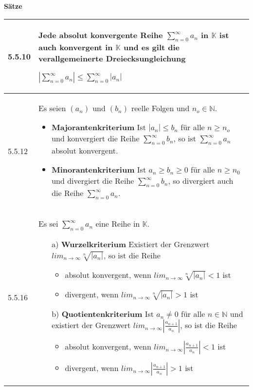     \noindent 
    \textbf{Sätze}
    \begin{table}[H]
    \begin{tabularx}{\textwidth}{X m{16cm}}
        \toprule

        5.5.10& Jede absolut konvergente Reihe $\sum^{\infty}_{n=0} a_n$ in $\mathbb{K}$ ist auch konvergent in $\mathbb{K}$ und es
                gilt die verallgemeinerte Dreiecksungleichung \hfill \break
                \centerline{$|\sum^{\infty}_{n=0}a_n| \leq \sum^{\infty}_{n=0} |a_n|$} \\
        \midrule
        5.5.12& Es seien $(a_n)$ und $(b_n)$ reelle Folgen und $n_o \in \mathbb{N}$.
                \begin{itemize}
                    \item \textbf{Majorantenkriterium} \hfill \break 
                            Ist $|a_n| \leq b_n$ für alle $n \geq n_o$ und konvergiert die Reihe $\sum^{\infty}_{n=0}b_n$, so ist
                            $\sum^{\infty}_{n=0} a_n$ absolut konvergent.
                    \item \textbf{Minorantenkriterium} \hfill \break
                            Ist $a_n \geq b_n \geq 0$ für alle $n \geq n_0$ und divergiert die Reihe $\sum^{\infty}_{n=0}b_n$, so 
                            divergiert auch die Reihe $\sum^{\infty}_{n=0}a_n$. 
                \end{itemize} \\
        \midrule
        5.5.16& Es sei $\sum^{\infty}_{n=0}a_n$ eine Reihe in $\mathbb{K}$.
                \begin{itemize}
                    \item[a)] \textbf{Wurzelkriterium} \hfill \break
                            Existiert der Grenzwert $lim_{n \rightarrow \infty} \sqrt[n]{|a_n|}$, so ist die Reihe
                            \begin{itemize}
                                \item absolut konvergent, wenn $lim_{n \rightarrow \infty} \sqrt[n]{|a_n|} < 1$ ist
                                \item divergent, wenn $lim_{n \rightarrow \infty} \sqrt[n]{|a_n|} > 1$ ist
                            \end{itemize}
                    \item[b)] \textbf{Quotientenkriterium} \hfill \break
                            Ist $a_n \neq 0$ für alle $n \in \mathbb{N}$ und existiert der Grenzwert 
                            $lim_{n \rightarrow \infty} |\frac{a_{n+1}}{a_n}|$, so ist die Reihe
                            \begin{itemize}
                                \item absolut konvergent, wenn $lim_{n \rightarrow \infty} |\frac{a_{n+1}}{a_n}| < 1$ ist
                                \item divergent, wenn $lim_{n \rightarrow \infty} |\frac{a_{n+1}}{a_n}| > 1$ ist
                            \end{itemize}
                \end{itemize} \\


\end{tabularx}
\end{table}
